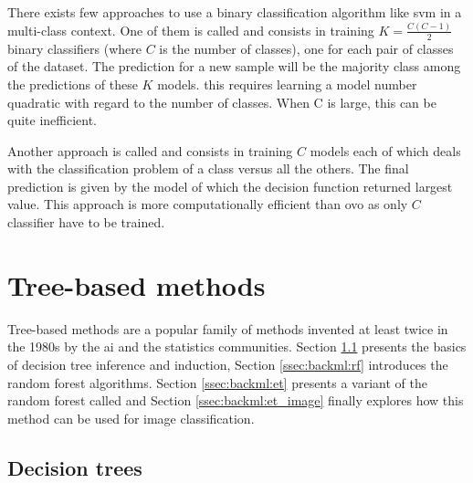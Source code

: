 There exists few approaches to use a binary classification algorithm like \acrshort{svm} in a multi-class context. One of them is called  and consists in training $K=\frac{C(C-1)}{2}$ binary classifiers (where $C$ is the number of classes), one for each pair of classes of the dataset. The prediction for a new sample will be the majority class among the predictions of these $K$ models. this requires learning a model number quadratic with regard to the number of classes. When C is large, this can be quite inefficient.

Another approach is called  and consists in training $C$ models each of which deals with the classification problem of a class versus all the others. The final prediction is given by the model of which the decision function returned largest value. This approach is more computationally efficient than \acrshort{ovo} as only $C$ classifier have to be trained.

\section{Tree-based methods}
\label{sec:backml:treebased}

Tree-based methods are a popular family of methods invented at least twice in the 1980s by the \acrshort{ai} \parencite{quinlan1986induction} and the statistics \parencite{breiman2017classification} communities. Section \ref{ssec:backml:dt} presents the basics of decision tree inference and induction, Section \ref{ssec:backml:rf} introduces the random forest algorithms. Section \ref{ssec:backml:et} presents a variant of the random forest called  and Section \ref{ssec:backml:et_image} finally explores how this method can be used for image classification.

\subsection{Decision trees}
\label{ssec:backml:dt}

